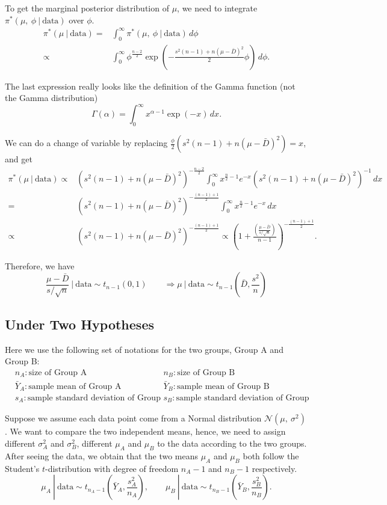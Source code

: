 \documentclass{article}
\def\dsst{\displaystyle}
\begin{document}
To get the marginal posterior distribution of $\mu$, we need to integrate $\pi^*(\mu,\ \phi~|~\text{data})$ over $\phi$.
\begin{align*}
\pi^*(\mu~|~\text{data}) = & \int_0^\infty \pi^*(\mu,\ \phi~|~\text{data})\, d\phi \\
\propto & \int_0^\infty \phi^{\frac{n-2}{2}}\exp\left(-\frac{s^2(n-1)+n(\mu-\bar{D})^2}{2}\phi\right)\, d\phi. 
\end{align*}

The last expression really looks like the definition of the Gamma function (not the Gamma distribution)
$$ \Gamma(\alpha) = \int_0^\infty x^{\alpha - 1}\exp(-x)\, dx. $$

We can do a change of variable by replacing $\dsst \frac{\phi}{2}\left(s^2(n-1)+n(\mu-\bar{D})^2\right) = x$, and get
\begin{align*}
\pi^*(\mu~|~\text{data}) \propto & \left(s^2(n-1)+n(\mu-\bar{D})^2\right)^{-\frac{n-2}{2}} \int_0^\infty x^{\frac{n}{2}-1}e^{-x}\left(s^2(n-1)+n(\mu-\bar{D})^2\right)^{-1}\, dx \\
= & \left(s^2(n-1)+n(\mu-\bar{D})^2\right)^{-\frac{(n-1)+1}{2}} \int_0^\infty x^{\frac{n}{2}-1}e^{-x}\, dx \\
\propto & \left(s^2(n-1)+n(\mu-\bar{D})^2\right)^{-\frac{(n-1)+1}{2}} \propto \left(1 + \frac{\dsst \left(\frac{\mu-\bar{D}}{s/\sqrt{n}}\right)}{n-1}\right)^{-\frac{(n-1)+1}{2}}.
\end{align*}

Therefore, we have
$$ \frac{\mu-\bar{D}}{s/\sqrt{n}}~|~\text{data} \sim t_{n-1}\left(0, 1\right) \qquad \Longrightarrow \mu~|~\text{data} \sim t_{n-1}\left(\bar{D}, \frac{s^2}{n}\right) $$

\subsection{Under Two Hypotheses}

Here we use the following set of notations for the two groups, Group A and Group B:
\begin{align*}
& n_A : \text{size of Group A} && n_B: \text{size of Group B} &\\
& \bar{Y}_A: \text{sample mean of Group A} && \bar{Y}_B: \text{sample mean of Group B} & \\
& s_A: \text{sample standard deviation of Group A} && s_B: \text{sample standard deviation of Group B} &
\end{align*}

Suppose we assume each data point come from a Normal distribution $\mathcal{N}(\mu,\ \sigma^2)$. We want to compare the two independent means, hence, we need to assign different $\sigma_A^2$ and $\sigma_B^2$, different $\mu_A$ and $\mu_B$ to the data according to the two groups. After seeing the data, we obtain that the two means $\mu_A$ and $\mu_B$ both follow the Student's $t$-distribution with degree of freedom $n_A-1$ and $n_B-1$ respectively.
$$ \mu_A~|~\text{data} \sim t_{n_A-1}\left(\bar{Y}_A,\frac{s_A^2}{n_A}\right),\qquad \mu_B~|~\text{data} \sim t_{n_B-1}\left(\bar{Y}_B,\frac{s_B^2}{n_B}\right). $$
\end{document}
